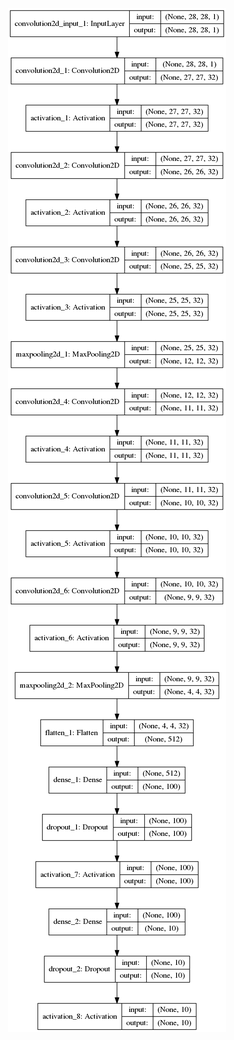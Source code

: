 \documentclass[tikz,10pt]{beamer}
\begin{document}
\begin{frame}
\begin{figure}
\begin{minipage}{.34\textwidth}
	\includegraphics[width=.4\linewidth, height=.9\textheight]{images/resultados/network_2/model}
	\end{minipage}

\end{figure}

\end{frame}
\end{document}
